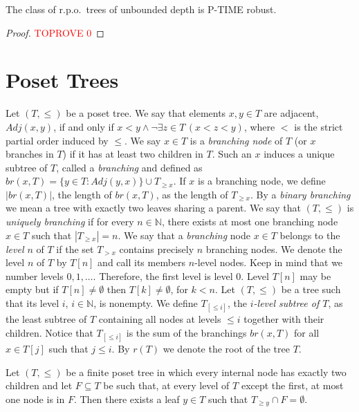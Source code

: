 \documentclass[a4paper,UKenglish,cleveref, autoref, thm-restate]{lipics-v2021}
\begin{document}
\begin{theorem}\label{ptime}
    The class of r.p.o.~trees of unbounded depth is P-TIME robust.

\end{theorem}
\begin{proof}\textcolor{red}{TOPROVE 0}\end{proof}
\section{Poset Trees}\label{sec:partially_ordered_trees}
Let $(T,\leq)$ be a poset tree. We say that elements $x , y \in T$ are adjacent, $Adj(x,y)$, if and only if $x < y \wedge \neg \exists z \in T \, (x < z < y)$, where $<$ is the strict partial order induced by $\leq$. We say $x \in T$ is a \emph{branching node} of $T$ (or $x$ branches in $T$) if it has at least two children in $T$. Such an $x$ induces a unique subtree of $T$, called a \emph{branching} and defined as $br(x,T) = \{y \in T: Adj(y,x) \} \cup T_{\geq x}$. If $x$ is a branching node, we define $|br(x,T)|$, the length of $br(x,T)$, as the length of $T_{\geq x}$. By a \emph{binary branching} we mean a tree with exactly two leaves sharing a parent.  
We say that $(T,\leq)$ is \emph{uniquely branching} if for every $n \in \mathbb N$, there exists at most one branching node $x \in T$ such that $|T_{\geq x}| = n$.
    We say that a \emph{branching} node $x \in T$ belongs to the \emph{level $n$} of $T$ if the set $T_{> x}$ contains precisely $n$ branching nodes. We denote the level $n$ of $T$ by $T[n]$ and call its members $n$-level nodes. Keep in mind that we number levels $0,1,\dots$. Therefore, the first level is level $0$. Level $T[n]$ may be empty but if $T[n]\neq \emptyset$ then $T[k] \neq \emptyset$, for $k < n$. 
Let $(T,\leq)$ be a tree such that its level $i$, $i \in \mathbb N$, is nonempty. We define $T_{[\leq i]}$, the \emph{$i$-level subtree of $T$}, as the least subtree of $T$ containing all nodes at levels $\leq i$ together with their children. 
Notice that $T_{[\leq i]}$ is the sum of the branchings $br(x,T)$ for all $x \in T[j]$ such that $j \leq i$.
By $r(T)$ we denote the root of the tree $T$.


\begin{lemma}\label{lemma:binary}
    Let $(T, \leq)$ be a finite poset tree in which every internal node has exactly two children and let $F \subseteq T$ be such that, at every level of $T$ except the first, at most one node is in $F$. Then there exists a leaf $y \in T$ such that $T_{\geq y} \cap F = \emptyset$. 
\end{lemma}
\end{document}

